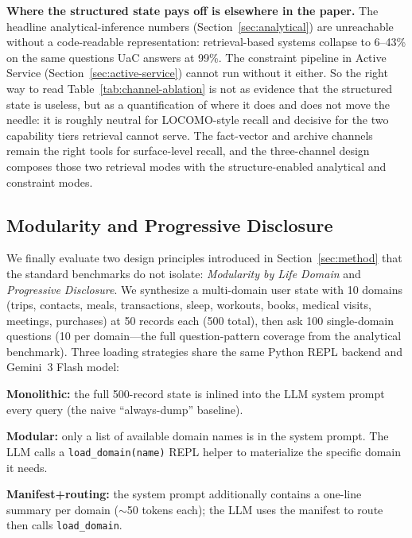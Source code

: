 \textbf{Where the structured state pays off is elsewhere in the paper.} The headline analytical-inference numbers (Section~\ref{sec:analytical}) are unreachable without a code-readable representation: retrieval-based systems collapse to 6--43\% on the same questions UaC answers at 99\%. The constraint pipeline in Active Service (Section~\ref{sec:active-service}) cannot run without it either. So the right way to read Table~\ref{tab:channel-ablation} is not as evidence that the structured state is useless, but as a quantification of where it does and does not move the needle: it is roughly neutral for LOCOMO-style recall and decisive for the two capability tiers retrieval cannot serve. The fact-vector and archive channels remain the right tools for surface-level recall, and the three-channel design composes those two retrieval modes with the structure-enabled analytical and constraint modes.

\subsection{Modularity and Progressive Disclosure}
\label{sec:modularity}

We finally evaluate two design principles introduced in Section~\ref{sec:method} that the standard benchmarks do not isolate: \emph{Modularity by Life Domain} and \emph{Progressive Disclosure}. We synthesize a multi-domain user state with 10 domains (trips, contacts, meals, transactions, sleep, workouts, books, medical visits, meetings, purchases) at 50 records each (500 total), then ask 100 single-domain questions (10 per domain---the full question-pattern coverage from the analytical benchmark). Three loading strategies share the same Python REPL backend and Gemini~3 Flash model:

\textbf{Monolithic:} the full 500-record state is inlined into the LLM system prompt every query (the naive ``always-dump'' baseline).

\textbf{Modular:} only a list of available domain names is in the system prompt. The LLM calls a \texttt{load\_domain(name)} REPL helper to materialize the specific domain it needs.

\textbf{Manifest+routing:} the system prompt additionally contains a one-line summary per domain ($\sim$50 tokens each); the LLM uses the manifest to route then calls \texttt{load\_domain}.

